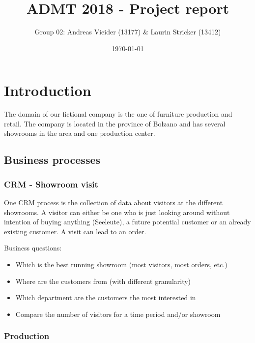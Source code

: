 \documentclass[letterpaper,12pt]{article}
\begin{document}
\title{ADMT 2018 - Project report}
\author{Group 02: Andreas Vieider (13177) \& Laurin Stricker (13412)}
\date{\today}
\maketitle

\tableofcontents
\listoffigures
\listoftables
\cleardoublepage



\section{Introduction}

The domain of our fictional company is the one of furniture production and retail. The company is located in the province of Bolzano and has several showrooms in the area and one production center.

\subsection{Business processes}

\subsubsection{CRM - Showroom visit}

One CRM process is the collection of data about visitors at the different showrooms. A visitor can either be one who is just looking around without intention of buying anything (Seeleute), a future potential customer or an already existing customer. A visit can lead to an order.

Business questions:
\begin{itemize}
        \item Which is the best running showroom (most visitors, most orders, etc.)
        \item Where are the customers from (with different granularity)
        \item Which department are the customers the most interested in
        \item Compare the number of visitors for a time period and/or showroom
\end{itemize}

\subsubsection{Production}
\end{document}
